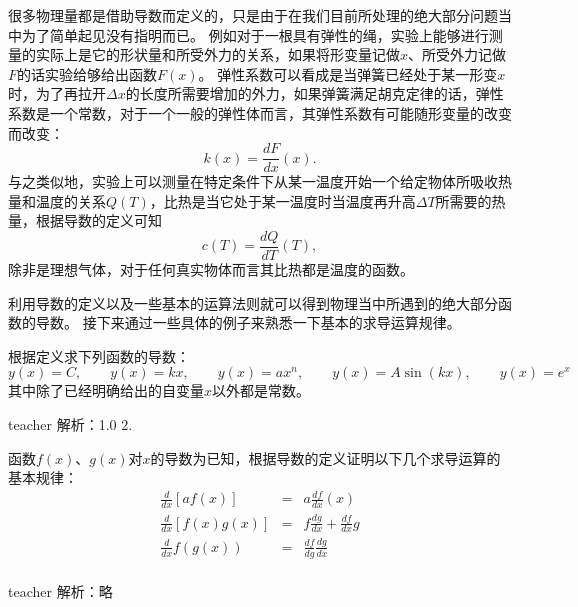 很多物理量都是借助导数而定义的，只是由于在我们目前所处理的绝大部分问题当中为了简单起见没有指明而已。
例如对于一根具有弹性的绳，实验上能够进行测量的实际上是它的形状量和所受外力的关系，如果将形变量记做$x$、所受外力记做$F$的话实验给够给出函数$F(x)$。
弹性系数可以看成是当弹簧已经处于某一形变$x$时，为了再拉开$\Delta x$的长度所需要增加的外力，如果弹簧满足胡克定律的话，弹性系数是一个常数，对于一个一般的弹性体而言，其弹性系数有可能随形变量的改变而改变：
\begin{equation}\label{key}
k(x) = \frac{dF}{dx}(x).
\end{equation}
与之类似地，实验上可以测量在特定条件下从某一温度开始一个给定物体所吸收热量和温度的关系$Q(T)$，比热是当它处于某一温度时当温度再升高$\Delta T$所需要的热量，根据导数的定义可知
\begin{equation}\label{key}
c(T) = \frac{dQ}{dT}(T),
\end{equation}
除非是理想气体，对于任何真实物体而言其比热都是温度的函数。

利用导数的定义以及一些基本的运算法则就可以得到物理当中所遇到的绝大部分函数的导数。
接下来通过一些具体的例子来熟悉一下基本的求导运算规律。

\begin{example}
	根据定义求下列函数的导数：
	\[
	y(x) = C,\qquad y(x) = kx,\qquad y(x) = ax^n, \qquad y(x) = A\sin(kx),\qquad y(x) = e^{x}
	\]
	其中除了已经明确给出的自变量$x$以外都是常数。
	\begin{taggedblock}{teacher}
		\newline
		解析：1.0  2.
	\end{taggedblock}
\end{example}

\begin{example}
	函数$f(x)$、$g(x)$对$x$的导数为已知，根据导数的定义证明以下几个求导运算的基本规律：
	\begin{eqnarray*}
		\frac{d}{dx}[af(x)] &=& a \frac{df}{dx}(x)\\
		\frac{d}{dx}[f(x)g(x)] &=& f\frac{dg}{dx}+\frac{df}{dx}g\\
		\frac{d}{dx}f(g(x)) &=&\frac{df}{dg}\frac{dg}{dx}\\
	\end{eqnarray*}
	\begin{taggedblock}{teacher}
		\noindent
		解析：略
	\end{taggedblock}
\end{example}


